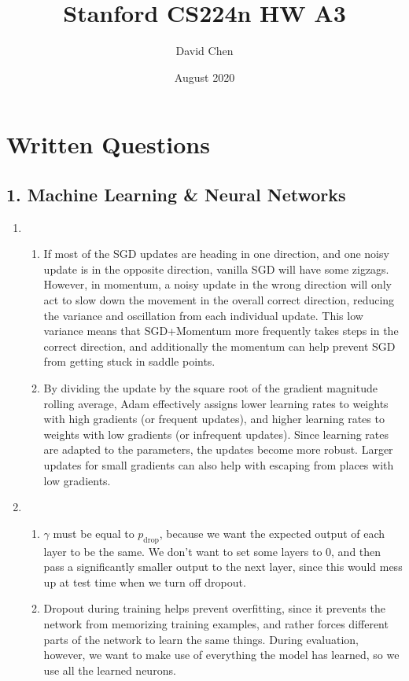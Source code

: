 \documentclass{article}
\title{Stanford CS224n HW A3}
\author{David Chen}
\date{August 2020}
\begin{document}
\maketitle

\section*{Written Questions}
\subsection*{1. Machine Learning \& Neural Networks}
\begin{enumerate}[label=(\alph*)]
    \item 
    \begin{enumerate}[label=\roman*.]
        \item If most of the SGD updates are heading in one direction, and one noisy update is in the opposite direction, vanilla SGD will have some zigzags. However, in momentum, a noisy update in the wrong direction will only act to slow down the movement in the overall correct direction, reducing the variance and oscillation from each individual update. This low variance means that SGD+Momentum more frequently takes steps in the correct direction, and additionally the momentum can help prevent SGD from getting stuck in saddle points.
        
        \item By dividing the update by the square root of the gradient magnitude rolling average, Adam effectively assigns lower learning rates to weights with high gradients (or frequent updates), and higher learning rates to weights with low gradients (or infrequent updates). Since learning rates are adapted to the parameters, the updates become more robust. Larger updates for small gradients can also help with escaping from places with low gradients.
    \end{enumerate}
    
    \item 
    \begin{enumerate}[label=\roman*.]
        \item $\gamma$ must be equal to $p_\text{drop}$, because we want the expected output of each layer to be the same. We don't want to set some layers to 0, and then pass a significantly smaller output to the next layer, since this would mess up at test time when we turn off dropout.
        
        \item Dropout during training helps prevent overfitting, since it prevents the network from memorizing training examples, and rather forces different parts of the network to learn the same things. During evaluation, however, we want to make use of everything the model has learned, so we use all the learned neurons.
    \end{enumerate}
\end{enumerate}
\end{document}
